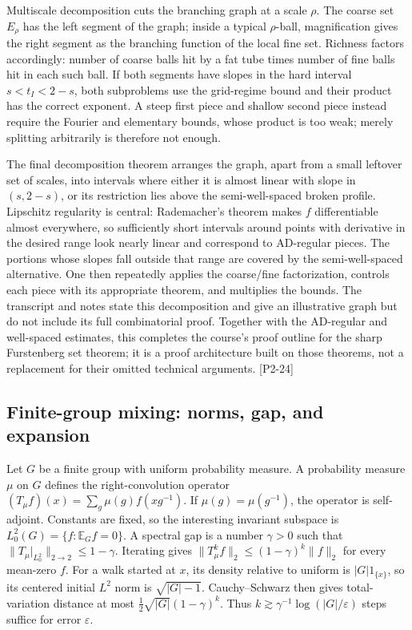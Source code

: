 Multiscale decomposition cuts the branching graph at a scale \(\rho\). The coarse set \(E_\rho\) has the left segment of the graph; inside a typical \(\rho\)-ball, magnification gives the right segment as the branching function of the local fine set. Richness factors accordingly: number of coarse balls hit by a fat tube times number of fine balls hit in each such ball. If both segments have slopes in the hard interval \(s<t_I<2-s\), both subproblems use the grid-regime bound and their product has the correct exponent. A steep first piece and shallow second piece instead require the Fourier and elementary bounds, whose product is too weak; merely splitting arbitrarily is therefore not enough.

The final decomposition theorem arranges the graph, apart from a small leftover set of scales, into intervals where either it is almost linear with slope in \((s,2-s)\), or its restriction lies above the semi-well-spaced broken profile. Lipschitz regularity is central: Rademacher's theorem makes \(f\) differentiable almost everywhere, so sufficiently short intervals around points with derivative in the desired range look nearly linear and correspond to AD-regular pieces. The portions whose slopes fall outside that range are covered by the semi-well-spaced alternative. One then repeatedly applies the coarse/fine factorization, controls each piece with its appropriate theorem, and multiplies the bounds. The transcript and notes state this decomposition and give an illustrative graph but do not include its full combinatorial proof. Together with the AD-regular and well-spaced estimates, this completes the course's proof outline for the sharp Furstenberg set theorem; it is a proof architecture built on those theorems, not a replacement for their omitted technical arguments. {[}P2-24{]}

\subsection{Finite-group mixing: norms, gap, and expansion}\label{04-visual-computing-ii-ch033-finite-group-mixing-norms-gap-and-expansion}

Let \(G\) be a finite group with uniform probability measure. A probability measure \(\mu\) on \(G\) defines the right-convolution operator \((T_\mu f)(x)=\sum_g\mu(g)f(xg^{-1})\). If \(\mu(g)=\mu(g^{-1})\), the operator is self-adjoint. Constants are fixed, so the interesting invariant subspace is \(L^2_0(G)=\{f:\mathbb E_G f=0\}\). A spectral gap is a number \(\gamma>0\) such that \(\|T_\mu|_{L^2_0}\|_{2\to2}\le1-\gamma\). Iterating gives \(\|T_\mu^k f\|_2\le(1-\gamma)^k\|f\|_2\) for every mean-zero \(f\). For a walk started at \(x\), its density relative to uniform is \(|G|1_{\{x\}}\), so its centered initial \(L^2\) norm is \(\sqrt{|G|-1}\). Cauchy--Schwarz then gives total-variation distance at most \(\tfrac12\sqrt{|G|}(1-\gamma)^k\). Thus \(k\gtrsim\gamma^{-1}\log(|G|/\varepsilon)\) steps suffice for error \(\varepsilon\).

